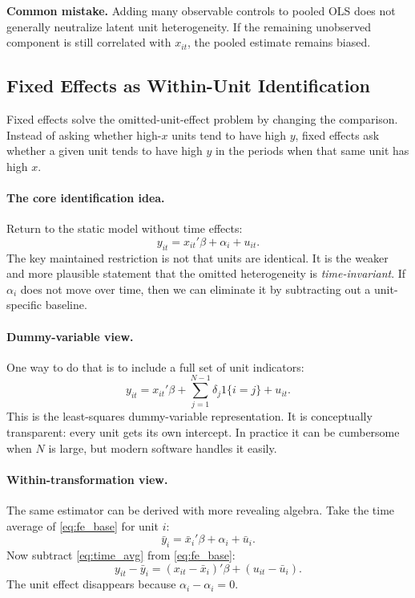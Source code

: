 \begin{boxF}
\textbf{Common mistake.}
Adding many observable controls to pooled \ac{OLS} does not generally neutralize latent unit heterogeneity. If the remaining unobserved component is still correlated with $x_{it}$, the pooled estimate remains biased.
\end{boxF}

\subsection{Fixed Effects as Within-Unit Identification}
Fixed effects solve the omitted-unit-effect problem by changing the comparison. Instead of asking whether high-$x$ units tend to have high $y$, fixed effects ask whether a given unit tends to have high $y$ in the periods when that same unit has high $x$.

\paragraph{The core identification idea.}
Return to the static model without time effects:
\begin{equation}
y_{it} = x_{it}'\beta + \alpha_i + u_{it}.
\label{eq:fe_base}
\end{equation}
The key maintained restriction is not that units are identical. It is the weaker and more plausible statement that the omitted heterogeneity is \emph{time-invariant}. If $\alpha_i$ does not move over time, then we can eliminate it by subtracting out a unit-specific baseline.

\paragraph{Dummy-variable view.}
One way to do that is to include a full set of unit indicators:
\begin{equation}
y_{it} = x_{it}'\beta + \sum_{j=1}^{N-1}\delta_j 1\{i=j\} + u_{it}.
\label{eq:lsdv}
\end{equation}
This is the least-squares dummy-variable representation. It is conceptually transparent: every unit gets its own intercept. In practice it can be cumbersome when $N$ is large, but modern software handles it easily.

\paragraph{Within-transformation view.}
The same estimator can be derived with more revealing algebra. Take the time average of \eqref{eq:fe_base} for unit $i$:
\begin{equation}
\bar{y}_i = \bar{x}_i'\beta + \alpha_i + \bar{u}_i.
\label{eq:time_avg}
\end{equation}
Now subtract \eqref{eq:time_avg} from \eqref{eq:fe_base}:
\begin{equation}
y_{it}-\bar{y}_i = (x_{it}-\bar{x}_i)'\beta + (u_{it}-\bar{u}_i).
\label{eq:within}
\end{equation}
The unit effect disappears because $\alpha_i-\alpha_i=0$.

